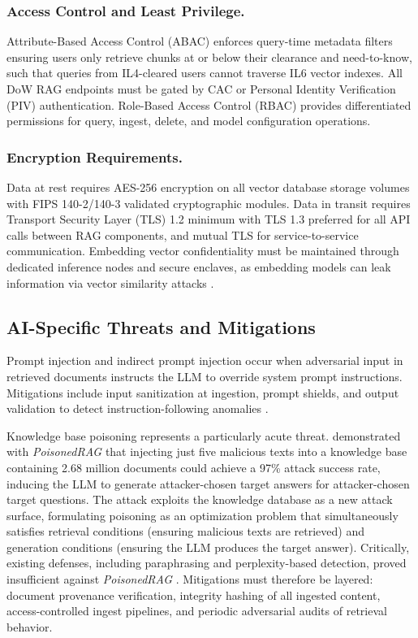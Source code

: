 \documentclass[12pt,letterpaper]{article}
\let\cite\parencite
\begin{document}
\subsubsection{Access Control and Least Privilege.}

Attribute-Based Access Control (ABAC) enforces query-time metadata filters ensuring users only retrieve chunks at or below their clearance and need-to-know, such that queries from IL4-cleared users cannot traverse IL6 vector indexes. All DoW RAG endpoints must be gated by CAC or Personal Identity Verification (PIV) authentication. Role-Based Access Control (RBAC) provides differentiated permissions for query, ingest, delete, and model configuration operations.

\subsubsection{Encryption Requirements.}

Data at rest requires AES-256 encryption on all vector database storage volumes with FIPS 140-2/140-3 validated cryptographic modules. Data in transit requires Transport Security Layer (TLS) 1.2 minimum with TLS 1.3 preferred for all API calls between RAG components, and mutual TLS for service-to-service communication. Embedding vector confidentiality must be maintained through dedicated inference nodes and secure enclaves, as embedding models can leak information via vector similarity attacks \cite{carlini2021}.

\subsection{AI-Specific Threats and Mitigations}

Prompt injection and indirect prompt injection occur when adversarial input in retrieved documents instructs the LLM to override system prompt instructions. Mitigations include input sanitization at ingestion, prompt shields, and output validation to detect instruction-following anomalies \cite{microsoft2026}.

Knowledge base poisoning represents a particularly acute threat. \textcite{zou2025} demonstrated with \textit{PoisonedRAG} that injecting just five malicious texts into a knowledge base containing 2.68 million documents could achieve a 97\% attack success rate, inducing the LLM to generate attacker-chosen target answers for attacker-chosen target questions. The attack exploits the knowledge database as a new attack surface, formulating poisoning as an optimization problem that simultaneously satisfies retrieval conditions (ensuring malicious texts are retrieved) and generation conditions (ensuring the LLM produces the target answer). Critically, existing defenses, including paraphrasing and perplexity-based detection, proved insufficient against \textit{PoisonedRAG} \cite{zou2025}. Mitigations must therefore be layered: document provenance verification, integrity hashing of all ingested content, access-controlled ingest pipelines, and periodic adversarial audits of retrieval behavior.
\end{document}
